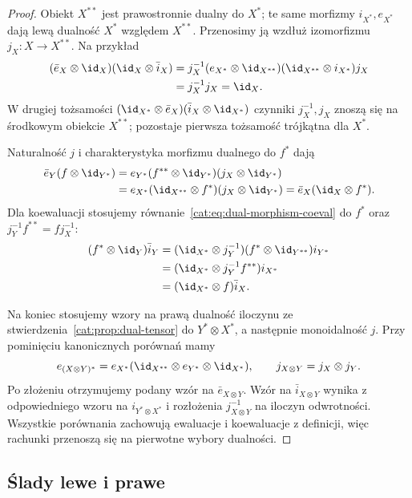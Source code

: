 \begin{proof}
Obiekt $X^{**}$ jest prawostronnie dualny do $X^*$; te same morfizmy $i_{X^*},e_{X^*}$ dają lewą dualność $X^*$ względem $X^{**}$. Przenosimy ją wzdłuż izomorfizmu $j_X:X\to X^{**}$. Na przykład
\[
\begin{aligned}
 (\bar e_X\otimes\id_X)(\id_X\otimes\bar i_X)
 &=j_X^{-1}(e_{X^*}\otimes\id_{X^{**}})
    (\id_{X^{**}}\otimes i_{X^*})j_X\\
 &=j_X^{-1}j_X=\id_X.
\end{aligned}
\]
W drugiej tożsamości $(\id_{X^*}\otimes\bar e_X)(\bar i_X\otimes\id_{X^*})$ czynniki $j_X^{-1},j_X$ znoszą się na środkowym obiekcie $X^{**}$; pozostaje pierwsza tożsamość trójkątna dla $X^*$.

Naturalność $j$ i charakterystyka morfizmu dualnego do $f^*$ dają
\[
\begin{aligned}
 \bar e_Y(f\otimes\id_{Y^*})
 &=e_{Y^*}(f^{**}\otimes\id_{Y^*})(j_X\otimes\id_{Y^*})\\
 &=e_{X^*}(\id_{X^{**}}\otimes f^*)(j_X\otimes\id_{Y^*})
 =\bar e_X(\id_X\otimes f^*).
\end{aligned}
\]
Dla koewaluacji stosujemy równanie~\eqref{cat:eq:dual-morphism-coeval} do $f^*$ oraz $j_Y^{-1}f^{**}=fj_X^{-1}$:
\[
\begin{aligned}
 (f^*\otimes\id_Y)\bar i_Y
 &=(\id_{X^*}\otimes j_Y^{-1})(f^*\otimes\id_{Y^{**}})i_{Y^*}\\
 &=(\id_{X^*}\otimes j_Y^{-1}f^{**})i_{X^*}\\
 &=(\id_{X^*}\otimes f)\bar i_X.
\end{aligned}
\]

Na koniec stosujemy wzory na prawą dualność iloczynu ze stwierdzenia~\ref{cat:prop:dual-tensor} do $Y^*\otimes X^*$, a następnie monoidalność $j$. Przy pominięciu kanonicznych porównań mamy
\[
 e_{(X\otimes Y)^*}
 =e_{X^*}(\id_{X^{**}}\otimes e_{Y^*}\otimes\id_{X^*}),
 \qquad j_{X\otimes Y}=j_X\otimes j_Y.
\]
Po złożeniu otrzymujemy podany wzór na $\bar e_{X\otimes Y}$. Wzór na $\bar i_{X\otimes Y}$ wynika z odpowiedniego wzoru na $i_{Y^*\otimes X^*}$ i rozłożenia $j_{X\otimes Y}^{-1}$ na iloczyn odwrotności. Wszystkie porównania zachowują ewaluacje i koewaluacje z definicji, więc rachunki przenoszą się na pierwotne wybory dualności.
\end{proof}

\subsection{Ślady lewe i prawe}

